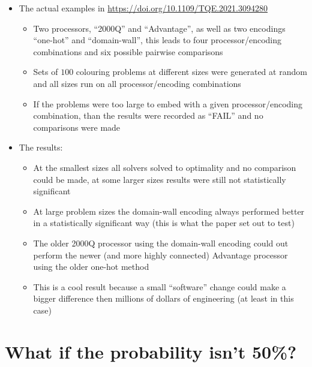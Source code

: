 \documentclass[english]{article}
\begin{document}
\begin{itemize}
\item The actual examples in \href{https://doi.org/10.1109/TQE.2021.3094280}{https://doi.org/10.1109/TQE.2021.3094280}
\begin{itemize}
\item Two processors, ``2000Q'' and ``Advantage'', as well as two encodings ``one-hot'' and ``domain-wall'', this leads to four processor/encoding combinations and six possible pairwise comparisons
\item Sets of $100$ colouring problems at different sizes were generated at random and all sizes run on all processor/encoding combinations
\item If the problems were too large to embed with a given processor/encoding combination, than the results were recorded as ``FAIL'' and no comparisons were made
\end{itemize}
\item The results:
\begin{itemize}
\item At the smallest sizes all solvers solved to optimality and no comparison could be made, at some larger sizes results were still not statistically significant
\item At large problem sizes the domain-wall encoding always performed better in a statistically significant way (this is what the paper set out to test)
\item The older 2000Q processor using the domain-wall encoding could out perform the newer (and more highly connected) Advantage processor using the older one-hot method
\item This is a cool result because a small ``software'' change could make a bigger difference then millions of dollars of engineering (at least in this case)
\end{itemize}
\end{itemize}

\section{What if the probability isn't 50\%?}
\end{document}
